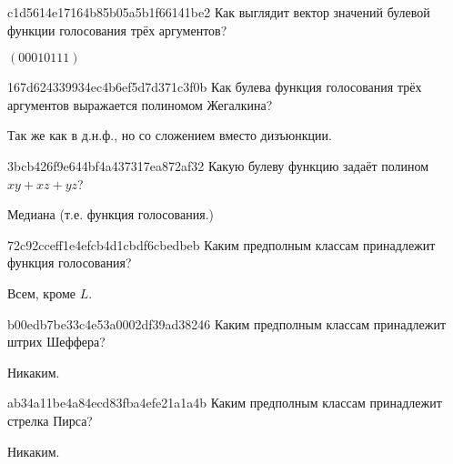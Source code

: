 \begin{note}{c1d5614e17164b85b05a5b1f66141be2}
    Как выглядит вектор значений булевой функции голосования трёх аргументов?

    \begin{cloze}{1}
        \({ (00010111) }\)
    \end{cloze}
\end{note}

\begin{note}{167d624339934ec4b6ef5d7d371c3f0b}
    Как булева функция голосования трёх аргументов выражается полиномом Жегалкина?

    \begin{cloze}{1}
        Так же как в д.н.ф., но со сложением вместо дизъюнкции.
    \end{cloze}
\end{note}

\begin{note}{3bcb426f9e644bf4a437317ea872af32}
    Какую булеву функцию задаёт полином \({ xy + xz + yz }\)?

    \begin{cloze}{1}
        Медиана (т.е. функция голосования.)
    \end{cloze}
\end{note}

\begin{note}{72c92cceff1e4efcb4d1cbdf6cbedbeb}
    Каким предполным классам принадлежит функция голосования?

    \begin{cloze}{1}
        Всем, кроме \({ L }\).
    \end{cloze}
\end{note}

\begin{note}{b00edb7be33c4e53a0002df39ad38246}
    Каким предполным классам принадлежит штрих Шеффера?

    \begin{cloze}{1}
        Никаким.
    \end{cloze}
\end{note}

\begin{note}{ab34a11be4a84ecd83fba4efe21a1a4b}
    Каким предполным классам принадлежит стрелка Пирса?

    \begin{cloze}{1}
        Никаким.
    \end{cloze}
\end{note}

